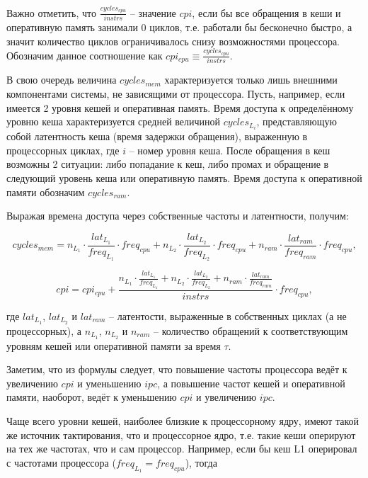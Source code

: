     Важно отметить, что $\frac{cycles_{cpu}}{instrs}$ -- значение $cpi$, если бы все обращения
    в кеши и оперативную память занимали 0 циклов, т.е. работали бы бесконечно быстро, а значит
    количество циклов ограничивалось снизу возможностями процессора. Обозначим данное соотношение
    как $cpi_{cpu} \equiv \frac{cycles_{cpu}}{instrs}$.

    В свою очередь величина $cycles_{mem}$ характеризуется только лишь внешними компонентами системы,
    не зависящими от процессора. Пусть, например, если имеется 2 уровня кешей и оперативная память.
    Время доступа к определённому уровню кеша характеризуется средней величиной $cycles_{L_{i}}$,
    представляющую собой латентность кеша (время задержки обращения), выраженную в процессорных
    циклах, где $i$ -- номер уровня кеша.
    После обращения в кеш возможны 2 ситуации: либо попадание к кеш, либо промах и обращение в
    следующий уровень кеша или оперативную память.
    Время доступа к оперативной памяти обозначим $cycles_{ram}$.

    Выражая времена доступа через собственные частоты и латентности, получим:

    \begin{equation}
        cycles_{mem} = n_{L_1} \cdot \frac{lat_{L_1}}{freq_{L_1}} \cdot freq_{cpu} +
        n_{L_2} \cdot \frac{lat_{L_2}}{freq_{L_2}} \cdot freq_{cpu} +
        n_{ram} \cdot \frac{lat_{ram}}{freq_{ram}} \cdot freq_{cpu},
    \end{equation}

    \begin{equation}
        cpi = cpi_{cpu} + \frac{n_{L_1} \cdot \frac{lat_{L_1}}{freq_{L_1}} +
        n_{L_2} \cdot \frac{lat_{L_2}}{freq_{L_2}} +
        n_{ram} \cdot \frac{lat_{ram}}{freq_{ram}}}{instrs} \cdot freq_{cpu},
    \end{equation}

    где $lat_{L_1}$, $lat_{L_2}$ и $lat_{ram}$ -- латентости, выраженные в собственных циклах
    (а не процессорных), а $n_{L_1}$, $n_{L_2}$ и $n_{ram}$ -- количество обращений к соответствующим
    уровням кешей или оперативной памяти за время $\tau$.

    Заметим, что из формулы следует, что повышение частоты процессора ведёт к увеличению $cpi$
    и уменьшению $ipc$, а повышение частот кешей и оперативной памяти, наоборот, ведёт к
    уменьшению $cpi$ и увеличению $ipc$.

    Чаще всего уровни кешей, наиболее близкие к процессорному ядру, имеют такой же источник
    тактирования, что и процессорное ядро, т.е. такие кеши оперируют на тех же частотах, что и
    сам процессор. Например, если бы кеш L1 оперировал с частотами процессора
    ($freq_{L_1} = freq_{cpu}$), тогда

